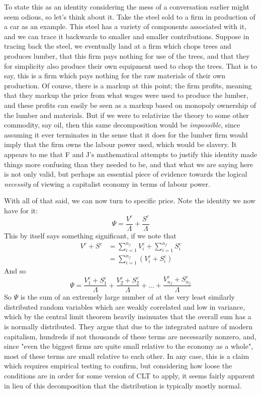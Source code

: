 To state this as an identity considering the mess of a conversation earlier might seem odious, so let's think about it. Take the steel sold to a firm in production of a car as an example. This steel has a variety of components associated with it, and we can trace it backwards to smaller and smaller contributions. Suppose in tracing back the steel, we eventually land at a firm which chops trees and produces lumber, that this firm pays nothing for use of the trees, and that they for simplicity also produce their own equipment used to chop the trees. That is to say, this is a firm which pays nothing for the raw materials of their own production. Of course, there is a markup at this point; the firm profits, meaning that they markup the price from what wages were used to produce the lumber, and these profits can easily be seen as a markup based on monopoly ownership of the lumber and materials. But if we were to relativize the theory to some other commodity, say oil, then this same decomposition would be \textit{impossible}, since assuming it ever terminates in the sense that it does for the lumber firm would imply that the firm owns the labour power used, which would be slavery. It appears to me that F and J's mathematical attempts to justify this identity made things more confusing than they needed to be, and that what we are saying here is not only valid, but perhaps an essential piece of evidence towards the logical \textit{necessity} of viewing a capitalist economy in terms of labour power. \par 
With all of that said, we can now turn to specific price. Note the identity we now have for it:
\[ \Psi = \frac{V^c}{\Lambda} + \frac{S^c}{\Lambda} \]
This by itself says something significant, if we note that
\begin{align}
	 V^c + S^c &= \sum_{i=1}^{n_f} V^c_i + \sum_{i=1}^{n_f} S^c_i \\
	 		   &= \sum_{i=1}^{n_f} (V^c_i + S^c_i)
\end{align}
And so 
\[ \Psi = \frac{V^c_1+S^c_1}{\Lambda} + \frac{V^c_2+S^c_2}{\Lambda} + \ldots + \frac{V^c_{n_f}+S^c_{n_f}}{\Lambda} \]
So $\Psi$ is the sum of an extremely large number of at the very least similarly distributed random variables which are weakly correlated and low in variance, which by the central limit theorem heavily insinuates that the overall sum has a is normally distributed. They argue that due to the integrated nature of modern capitalism, hundreds if not thousands of these terms are necessarily nonzero, and, since "even the biggest firms are quite small relative to the economy as a whole", most of these terms are small relative to each other. In any case, this is a claim which requires empirical testing to confirm, but considering how loose the conditions are in order for some version of CLT to apply, it seems fairly apparent in lieu of this decomposition that the distribution is typically mostly normal. \par 
